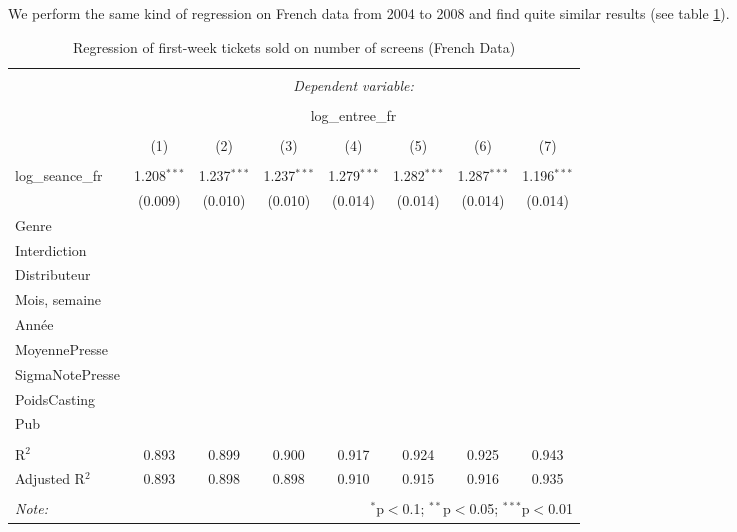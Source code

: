 We perform the same kind of regression on French data from 2004 to 2008 and find quite similar results (see table \ref{part2.1_tab3}). 
\begin{table}[!htbp] \centering 
	\caption{Regression of first-week tickets sold on number of screens (French Data)} 
	\label{part2.1_tab3} 
	\begin{tabular}{@{\extracolsep{0pt}}lccccccc} 
		\\[-1.8ex]\hline 
		\hline \\[-1.8ex] 
		& \multicolumn{7}{c}{\textit{Dependent variable:}} \\ 
		\cline{2-8} 
		\\[-1.8ex] & \multicolumn{7}{c}{log\_entree\_fr} \\ 
		\\[-1.8ex] & (1) & (2) & (3) & (4) & (5) & (6) & (7)\\ 
		\hline \\[-1.8ex] 
		log\_seance\_fr & 1.208$^{***}$ & 1.237$^{***}$ & 1.237$^{***}$ & 1.279$^{***}$ & 1.282$^{***}$ & 1.287$^{***}$ & 1.196$^{***}$ \\ 
		& (0.009) & (0.010) & (0.010) & (0.014) & (0.014) & (0.014) & (0.014) \\ 
		Genre & & \checkmark & \checkmark & \checkmark & \checkmark & \checkmark & \checkmark \\
		Interdiction & && \checkmark & \checkmark & \checkmark & \checkmark & \checkmark \\
		Distributeur & &&& \checkmark & \checkmark & \checkmark & \checkmark \\
		Mois, semaine &&&&& \checkmark & \checkmark & \checkmark \\
		Année &&&&&& \checkmark & \checkmark \\
		MoyennePresse &&&&&&& \checkmark \\
		SigmaNotePresse &&&&&&& \checkmark \\
		PoidsCasting &&&&&&& \checkmark \\
		Pub &&&&&&& \checkmark \\
		\hline \\[-1.8ex] 
		R$^{2}$ & 0.893 & 0.899 & 0.900 & 0.917 & 0.924 & 0.925 & 0.943 \\ 
		Adjusted R$^{2}$ & 0.893 & 0.898 & 0.898 & 0.910 & 0.915 & 0.916 & 0.935 \\ 
		\hline 
		\hline \\[-1.8ex] 
		\textit{Note:}  & \multicolumn{7}{r}{$^{*}$p$<$0.1; $^{**}$p$<$0.05; $^{***}$p$<$0.01} \\ 
	\end{tabular} 
\end{table} 
